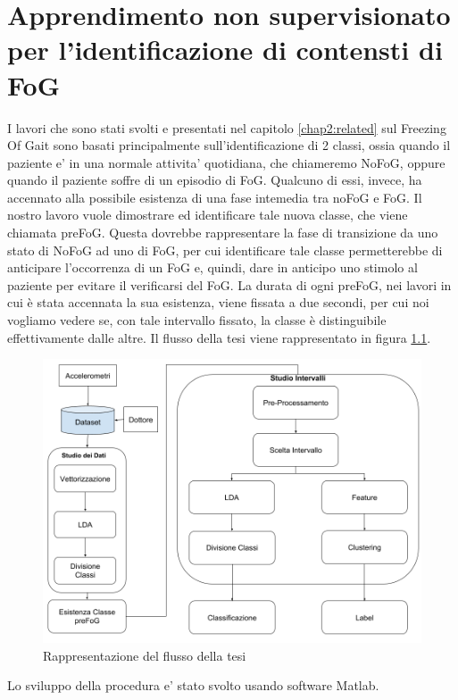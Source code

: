 

\chapter[Apprendimento non supervisionato]{Apprendimento non supervisionato per l'identificazione di contensti di FoG}\label{chap5:Automatic}
I lavori che sono stati svolti e presentati nel capitolo \ref{chap2:related} sul Freezing Of Gait sono basati principalmente sull'identificazione di 2 classi, ossia quando il paziente e' in una normale attivita' quotidiana, che chiameremo NoFoG, oppure quando il paziente soffre di un episodio di FoG. Qualcuno di essi, invece, ha accennato alla possibile esistenza di una fase intemedia tra noFoG e FoG. Il nostro lavoro vuole dimostrare ed identificare tale nuova classe, che viene chiamata preFoG. Questa dovrebbe rappresentare la fase di transizione da uno stato di NoFoG ad uno di FoG, per cui identificare tale classe permetterebbe di anticipare l'occorrenza di un FoG e, quindi, dare in anticipo uno stimolo al paziente per evitare il verificarsi del FoG. La durata di ogni preFoG, nei lavori in cui è stata accennata la sua esistenza, viene fissata a due secondi, per cui noi vogliamo vedere se, con tale intervallo fissato, la classe è distinguibile effettivamente dalle altre. Il flusso della tesi viene rappresentato in figura \ref{FlussoTesi}.\\
\begin{figure}[]
	\centering
	\includegraphics[scale=0.35]{images/FlussoTesi.png}
	\caption{Rappresentazione del flusso della tesi}
	\label{FlussoTesi}
\end{figure}
Lo sviluppo della procedura e' stato svolto usando software Matlab.

